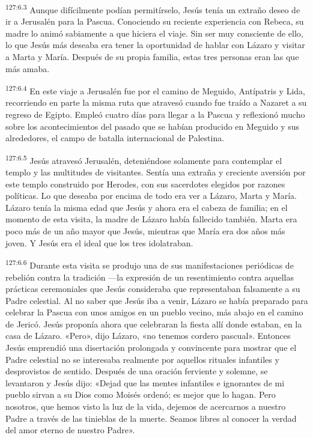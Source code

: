 \par 
\textsuperscript{127:6.3} Aunque difícilmente podían permitírselo, Jesús tenía un extraño deseo de ir a Jerusalén para la Pascua. Conociendo su reciente experiencia con Rebeca, su madre lo animó sabiamente a que hiciera el viaje. Sin ser muy consciente de ello, lo que Jesús más deseaba era tener la oportunidad de hablar con Lázaro y visitar a Marta y María. Después de su propia familia, estas tres personas eran las que más amaba.

\par 
\textsuperscript{127:6.4} En este viaje a Jerusalén fue por el camino de Meguido, Antípatris y Lida, recorriendo en parte la misma ruta que atravesó cuando fue traído a Nazaret a su regreso de Egipto. Empleó cuatro días para llegar a la Pascua y reflexionó mucho sobre los acontecimientos del pasado que se habían producido en Meguido y sus alrededores, el campo de batalla internacional de Palestina.

\par 
\textsuperscript{127:6.5} Jesús atravesó Jerusalén, deteniéndose solamente para contemplar el templo y las multitudes de visitantes. Sentía una extraña y creciente aversión por este templo construido por Herodes, con sus sacerdotes elegidos por razones políticas. Lo que deseaba por encima de todo era ver a Lázaro, Marta y María. Lázaro tenía la misma edad que Jesús y ahora era el cabeza de familia; en el momento de esta visita, la madre de Lázaro había fallecido también. Marta era poco más de un año mayor que Jesús, mientras que María era dos años más joven. Y Jesús era el ideal que los tres idolatraban.

\par 
\textsuperscript{127:6.6} Durante esta visita se produjo una de sus manifestaciones periódicas de rebelión contra la tradición ---la expresión de un resentimiento contra aquellas prácticas ceremoniales que Jesús consideraba que representaban falsamente a su Padre celestial. Al no saber que Jesús iba a venir, Lázaro se había preparado para celebrar la Pascua con unos amigos en un pueblo vecino, más abajo en el camino de Jericó. Jesús proponía ahora que celebraran la fiesta allí donde estaban, en la casa de Lázaro. «Pero», dijo Lázaro, «no tenemos cordero pascual». Entonces Jesús emprendió una disertación prolongada y convincente para mostrar que el Padre celestial no se interesaba realmente por aquellos rituales infantiles y desprovistos de sentido. Después de una oración ferviente y solemne, se levantaron y Jesús dijo: «Dejad que las mentes infantiles e ignorantes de mi pueblo sirvan a su Dios como Moisés ordenó; es mejor que lo hagan. Pero nosotros, que hemos visto la luz de la vida, dejemos de acercarnos a nuestro Padre a través de las tinieblas de la muerte. Seamos libres al conocer la verdad del amor eterno de nuestro Padre».

